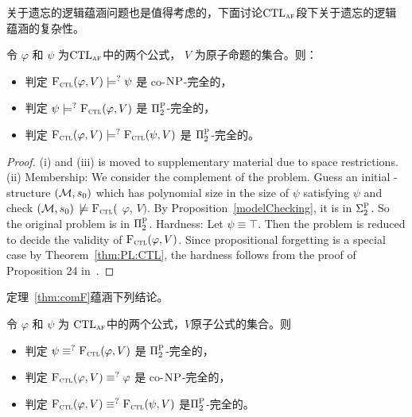 关于遗忘的逻辑蕴涵问题也是值得考虑的，下面讨论$\textrm{CTL}_{\textsc{a}\textsc{f}}$段下关于遗忘的逻辑蕴涵的复杂性。

\begin{theorem}[Entailment]
	\label{thm:comF}
	令 $\varphi$ 和 $\psi$ 为$\textrm{CTL}_{\textsc{a} \textsc{f}}$中的两个公式， $V$ 为原子命题的集合。则：
	\begin{itemize}
		\item[(i)] 判定  ${\textsc{F}_{\textsc{ctl}}}(\varphi, V ) \models^? \psi$ 是 co-$\textsc{NP}$-完全的，
		\item[(ii)] 判定  $\psi \models^? {\textsc{F}_{\textsc{ctl}}}(\varphi, V)$ 是 $\Pi_2^{\textsc{P}}$-完全的，
		\item[(iii)] 判定 ${\textsc{F}_{\textsc{ctl}}}(\varphi, V) \models^? {\textsc{F}_{\textsc{ctl}}}(\psi, V)$ 是 $\Pi_2^{\textsc{P}}$-完全的。
	\end{itemize}
\end{theorem}
\begin{proof}
	(i) and (iii) is moved to supplementary material due to space restrictions.
	(ii) Membership: We consider the complement of the
	problem. Guess an initial \MPK-structure $({\cal M}, s_0)$ which has  polynomial size in the size of $\psi$ satisfying $\psi$ and check $({\cal M},s_0)$ $\not \models {\textsc{F}_{\textsc{ctl}}}($ $\varphi$, $V)$. By Proposition~\ref{modelChecking}, it is in $\Sigma_2^{\textsc{P}}$. So the original problem is in $\Pi_2^{\textsc{P}}$. Hardness: Let $\psi \equiv \top$. Then the problem is reduced to decide the validity of  ${\textsc{F}_{\textsc{ctl}}}(\varphi, V )$. Since propositional forgetting is a special case by Theorem~\ref{thm:PL:CTL}, the hardness  follows from the proof of Proposition 24 in~\cite{DBLP:journals/jair/LangLM03}.
\end{proof}



定理~\ref{thm:comF}蕴涵下列结论。
\begin{corollary}
	令 $\varphi$ 和 $\psi$ 为 $\textrm{CTL}_{\textsc{a} \textsc{f}}$中的两个公式，$V$原子公式的集合。则
	\begin{itemize}
		\item[(i)] 判定 $\psi \equiv^?{\textsc{F}_{\textsc{ctl}}}(\varphi, V)$ 是 $\Pi_2^{\textsc{P}}$-完全的，
		\item[(ii)] 判定 ${\textsc{F}_{\textsc{ctl}}}(\varphi, V) \equiv^? \varphi$ 是 co-$\textsc{NP}$-完全的，
		\item[(iii)] 判定 ${\textsc{F}_{\textsc{ctl}}}(\varphi, V) \equiv^? {\textsc{F}_{\textsc{ctl}}}(\psi, V)$ 是$\Pi_2^{\textsc{P}}$-完全的。
	\end{itemize}
\end{corollary}

